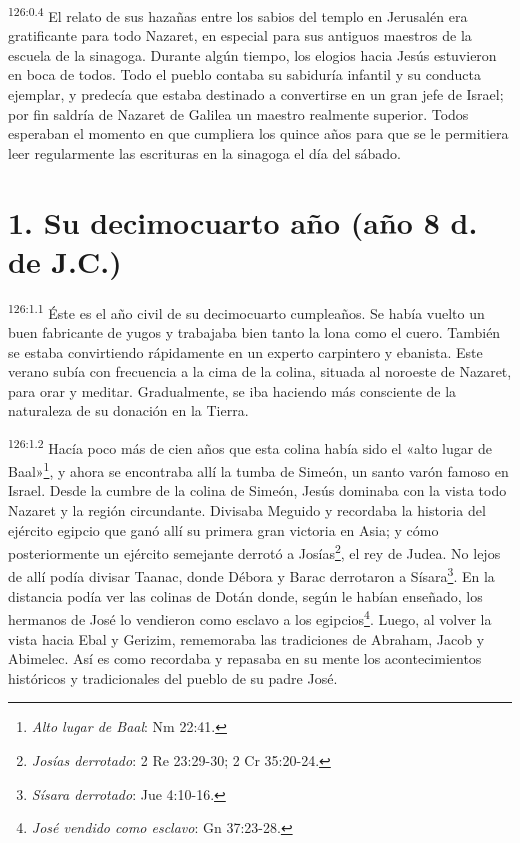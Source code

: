 \par
\textsuperscript{126:0.4} El relato de sus hazañas entre los sabios del templo en Jerusalén era gratificante para todo Nazaret, en especial para sus antiguos maestros de la escuela de la sinagoga. Durante algún tiempo, los elogios hacia Jesús estuvieron en boca de todos. Todo el pueblo contaba su sabiduría infantil y su conducta ejemplar, y predecía que estaba destinado a convertirse en un gran jefe de Israel; por fin saldría de Nazaret de Galilea un maestro realmente superior. Todos esperaban el momento en que cumpliera los quince años para que se le permitiera leer regularmente las escrituras en la sinagoga el día del sábado.

\section*{1. Su decimocuarto año (año 8 d. de J.C.)}
\par
\textsuperscript{126:1.1} Éste es el año civil de su decimocuarto cumpleaños. Se había vuelto un buen fabricante de yugos y trabajaba bien tanto la lona como el cuero. También se estaba convirtiendo rápidamente en un experto carpintero y ebanista. Este verano subía con frecuencia a la cima de la colina, situada al noroeste de Nazaret, para orar y meditar. Gradualmente, se iba haciendo más consciente de la naturaleza de su donación en la Tierra.

\par
\textsuperscript{126:1.2} Hacía poco más de cien años que esta colina había sido el «alto lugar de Baal»\footnote{\textit{Alto lugar de Baal}: Nm 22:41.}, y ahora se encontraba allí la tumba de Simeón, un santo varón famoso en Israel. Desde la cumbre de la colina de Simeón, Jesús dominaba con la vista todo Nazaret y la región circundante. Divisaba Meguido y recordaba la historia del ejército egipcio que ganó allí su primera gran victoria en Asia; y cómo posteriormente un ejército semejante derrotó a Josías\footnote{\textit{Josías derrotado}: 2 Re 23:29-30; 2 Cr 35:20-24.}, el rey de Judea. No lejos de allí podía divisar Taanac, donde Débora y Barac derrotaron a Sísara\footnote{\textit{Sísara derrotado}: Jue 4:10-16.}. En la distancia podía ver las colinas de Dotán donde, según le habían enseñado, los hermanos de José lo vendieron como esclavo a los egipcios\footnote{\textit{José vendido como esclavo}: Gn 37:23-28.}. Luego, al volver la vista hacia Ebal y Gerizim, rememoraba las tradiciones de Abraham, Jacob y Abimelec. Así es como recordaba y repasaba en su mente los acontecimientos históricos y tradicionales del pueblo de su padre José.

